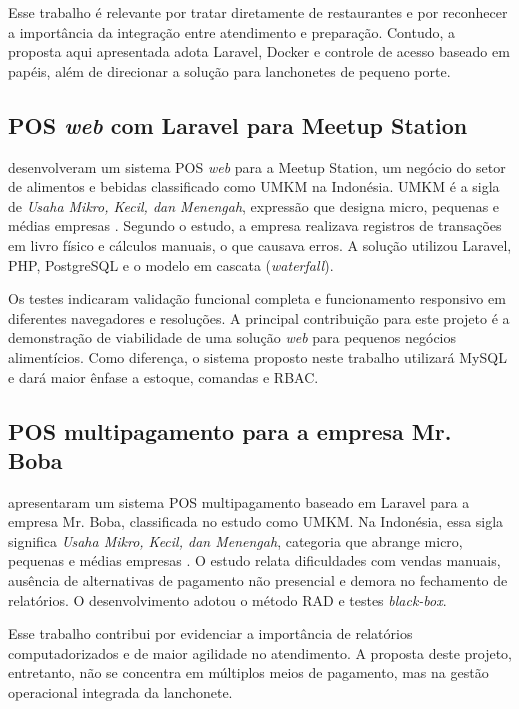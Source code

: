 Esse trabalho é relevante por tratar diretamente de restaurantes e por reconhecer a importância da integração entre atendimento e preparação. Contudo, a proposta aqui apresentada adota Laravel, Docker e controle de acesso baseado em papéis, além de direcionar a solução para lanchonetes de pequeno porte.

\subsection{POS \textit{web} com Laravel para Meetup Station}

 desenvolveram um sistema POS \textit{web} para a Meetup Station, um negócio do setor de alimentos e bebidas classificado como UMKM na Indonésia. UMKM é a sigla de \textit{Usaha Mikro, Kecil, dan Menengah}, expressão que designa micro, pequenas e médias empresas \cite{ojk2024tkbi}. Segundo o estudo, a empresa realizava registros de transações em livro físico e cálculos manuais, o que causava erros. A solução utilizou Laravel, PHP, PostgreSQL e o modelo em cascata (\textit{waterfall}).

Os testes indicaram validação funcional completa e funcionamento responsivo em diferentes navegadores e resoluções. A principal contribuição para este projeto é a demonstração de viabilidade de uma solução \textit{web} para pequenos negócios alimentícios. Como diferença, o sistema proposto neste trabalho utilizará MySQL e dará maior ênfase a estoque, comandas e RBAC.

\subsection{POS multipagamento para a empresa Mr. Boba}

 apresentaram um sistema POS multipagamento baseado em Laravel para a empresa Mr. Boba, classificada no estudo como UMKM. Na Indonésia, essa sigla significa \textit{Usaha Mikro, Kecil, dan Menengah}, categoria que abrange micro, pequenas e médias empresas \cite{ojk2024tkbi}. O estudo relata dificuldades com vendas manuais, ausência de alternativas de pagamento não presencial e demora no fechamento de relatórios. O desenvolvimento adotou o método RAD e testes \textit{black-box}.

Esse trabalho contribui por evidenciar a importância de relatórios computadorizados e de maior agilidade no atendimento. A proposta deste projeto, entretanto, não se concentra em múltiplos meios de pagamento, mas na gestão operacional integrada da lanchonete.

